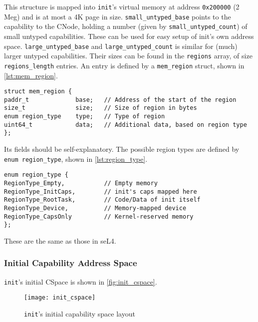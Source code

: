 \documentclass[a4paper,11pt,twoside]{report}
\begin{document}
This structure is mapped into \lstinline+init+'s virtual memory at
address \lstinline+0x200000+ (2 Meg) and is at most a 4K page in
size. \lstinline+small_untyped_base+ points to the capability to the
CNode, holding a number (given by \lstinline+small_untyped_count+) of
small untyped capabilities. These can be used for easy setup of
init's own address space. \lstinline+large_untyped_base+ and
\lstinline+large_untyped_count+ is similar for (much) larger untyped
capabilities. Their sizes can be found in the \lstinline+regions+ array,
of size \lstinline+regions_length+ entries. An entry is defined by a
\lstinline+mem_region+ struct, shown in \autoref{lst:mem_region}.

\begin{lstlisting}[float,caption={\lstinline+mem_region+ structure},
label=lst:mem_region]
struct mem_region {
paddr_t             base;   // Address of the start of the region
size_t              size;   // Size of region in bytes
enum region_type    type;   // Type of region
uint64_t            data;   // Additional data, based on region type
};
\end{lstlisting}

Its fields should be self-explanatory. The possible region types are
defined by \lstinline+enum region_type+, shown in \autoref{lst:region_type}.

\begin{lstlisting}[float,caption={\lstinline+region_type+ enumeration},
label=lst:region_type]
enum region_type {
RegionType_Empty,           // Empty memory
RegionType_InitCaps,        // init's caps mapped here
RegionType_RootTask,        // Code/Data of init itself
RegionType_Device,          // Memory-mapped device
RegionType_CapsOnly         // Kernel-reserved memory
};
\end{lstlisting}

These are the same as those in seL4.

\subsubsection{Initial Capability Address Space}

\lstinline+init+'s initial CSpace is shown in \autoref{fig:init_cspace}.

\begin{figure}
\centering
\texttt{[image: init\_cspace]}
\caption{\texttt{init}'s initial capability space layout}
\label{fig:init_cspace}
\end{figure}
\end{document}
